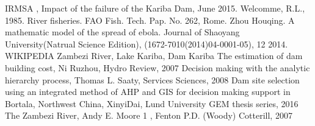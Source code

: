 \documentclass{mcmthesis}
\begin{document}
\begin{thebibliography}{99}
 IRMSA , Impact of the failure of the Kariba Dam, June 2015.
 Welcomme, R.L., 1985. River fisheries. FAO Fish. Tech. Pap. No. 262, Rome.
 Zhou Houqing. A mathematic model of the spread of ebola. Journal of Shaoyang
University(Natrual Science Edition), (1672-7010(2014)04-0001-05), 12 2014.
 WIKIPEDIA Zambezi River, Lake Kariba, Dam Kariba
 The estimation of dam building cost, Ni Ruzhou, Hydro Review, 2007
 Decision making with the analytic hierarchy process, Thomas L. Saaty, Services Sciences, 2008
 Dam site selection using an integrated method of AHP and GIS for decision making support in Bortala, Northwest China, XinyiDai, Lund University GEM thesis series, 2016
 The Zambezi River, Andy E. Moore 1 , Fenton P.D. (Woody) Cotterill, 2007
\end{thebibliography}

\clearpage
\end{document}
